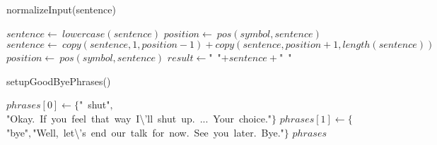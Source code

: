 \documentclass[a4paper,10pt]{article}
\begin{document}
\begin{algorithm}
\caption{normalizeInput(sentence)}
\begin{algorithmic}[5]

\STATE {}
\STATE {}
\STATE {}
  \STATE \(sentence\gets\ lowercase(sentence)\)
    \STATE \(position\gets\ pos(symbol,sentence)\)
      \STATE \(sentence\gets\ copy(sentence,1,position-1)+copy(sentence,position+1,length(sentence))\)
      \STATE \(position\gets\ pos(symbol,sentence)\)
    \ENDWHILE
  \ENDFOR
  \STATE \(result\gets\)"{}\ "{}\(+sentence+\)"{}\ "{}\(\)

\end{algorithmic}
\end{algorithm}


\begin{algorithm}
\caption{setupGoodByePhrases()}
\begin{algorithmic}[5]

  \STATE \(phrases[0]\gets\{\)"{}\ shut"{}\(,\)"{}Okay.\ If\ you\ feel\ that\ way\ I\textbackslash{}'{}ll\ shut\ up.\ ...\ Your\ choice."{}\(\}\)
  \STATE \(phrases[1]\gets\{\)"{}bye"{}\(,\)"{}Well,\ let\textbackslash{}'{}s\ end\ our\ talk\ for\ now.\ See\ you\ later.\ Bye."{}\(\}\)
  \RETURN\(phrases\)

\end{algorithmic}
\end{algorithm}
\end{document}

